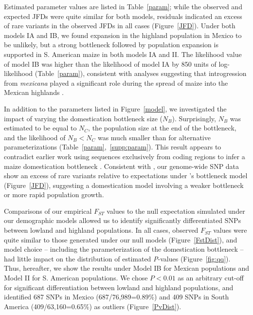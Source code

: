 Estimated parameter values are listed in Table~\ref{param}; while the observed and expected JFDs were quite similar for both models,  residuals indicated an excess of rare variants in the observed JFDs in all cases (Figure~\ref{JFD}). 
Under both models IA and IB,  we found expansion in the highland population in Mexico to be unlikely, but a strong bottleneck followed by population expansion is supported in S. American maize in both models IA and II.  
The likelihood value of model IB was higher than the likelihood of model IA by 850 units of log-likelihood (Table~\ref{param}), consistent with analyses suggesting that introgression from \textit{mexicana} played a significant role during the spread of maize into the Mexican highlands \cite[]{Profford_2013}. 

In addition to the parameters listed in Figure~\ref{model}, we investigated the impact of varying the domestication bottleneck size ($N_B$).  
Surprisingly, $N_B$ was estimated to be equal to $N_C$, the population size at the end of the bottleneck, and the likelihood of $N_B<N_C$ was much smaller than for alternative parameterizations (Table~\ref{param},~\ref{supp:param}). 
This result appears to contradict earlier work using sequences exclusively from coding regions to infer a maize domestication bottleneck \cite[]{Eyre-Walker_1998_9539756,Tenaillon_2004_15014173,Wright_2005_15919994}.  
Consistent with \citet{Hufford_2012_22660546}, our genome-wide SNP data show an excess of rare variants relative to expectations under \cite{Wright_2005_15919994}'s bottleneck model (Figure~\ref{JFD}), suggesting a domestication model involving a weaker bottleneck or more rapid population growth.

Comparisons of our empirical $F_{ST}$ values to the null expectation simulated under our demographic models allowed us to identify significantly differentiated SNPs between lowland and highland populations. In all cases, observed $F_{ST}$ values were quite similar to those generated under our null models (Figure~\ref{FstDist}), and model choice -- including the parameterization of the domestication bottleneck -- had little impact on the distribution of estimated \emph{P}-values (Figure~\ref{fig:qq}). 
Thus, hereafter, we show the results under Model IB for Mexican populations and Model II for S. American populations.
We chose $P<0.01$ as an arbitrary cut-off for significant differentiation between lowland and highland populations, and identified 687 SNPs in Mexico (687/76,989=0.89\%) and 409 SNPs in South America (409/63,160=0.65\%) as outliers (Figure~\ref{PvDist}). 

